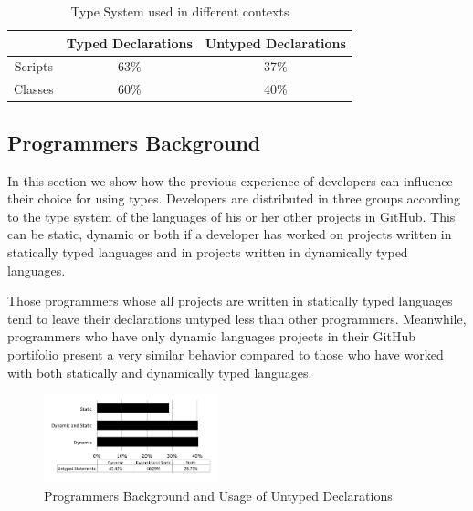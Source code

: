 \documentclass[preprint]{sigplanconf}
\begin{document}
\begin{table}[ht]
\caption{Type System used in different contexts}


\centering{}%
\begin{tabular}{|c|c|c|}
\hline 
 & Typed Declarations & Untyped Declarations\tabularnewline
\hline 
\hline 
Scripts & 63\% & 37\%\tabularnewline
\hline 
Classes & 60\% & 40\%\tabularnewline
\hline 
\end{tabular}
\label{tab:scritps}
\end{table}



\subsection{Programmers Background\label{sub:background}}

In this section we show how the previous experience of developers can influence their choice for using types.
Developers are distributed in three groups according to the type system of the languages of his or her other projects in GitHub.
This can be static, dynamic or both if a developer has worked on projects written in statically typed languages and in projects written in dynamically typed languages.

Those programmers whose all projects are written in statically typed languages tend to leave their declarations untyped less than other programmers. 
Meanwhile, programmers who have only dynamic languages projects in their GitHub portifolio present a very similar behavior compared to those who have worked with both statically and dynamically typed languages.

\begin{figure}[ht]
\centering \includegraphics[width=0.45\textwidth]{images/untyped_background} 
\caption{Programmers Background and Usage of Untyped Declarations}
\label{fig:untyped_background} 
\end{figure}
\end{document}
